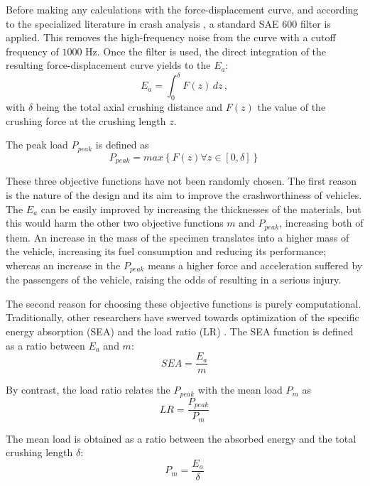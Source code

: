 \documentclass[cmfonts]{witpress}
\begin{document}
Before making any calculations with the force-displacement curve, and according to the specialized literature in crash analysis \cite{Huanglibro}, a standard SAE 600 filter \cite{J211} is applied. This removes the high-frequency noise from the curve with a cutoff frequency of ${1000}$ Hz. Once the filter is used, the direct integration of the resulting force-displacement curve yields to the $E_a$:
\begin{equation}\label{Ea}
  E_{a}=\int _{0}^{\delta }F\! \left( z \right) \,dz\,,
\end{equation}
with $\delta$ being the total axial crushing distance and $F\! \left( z \right)$ the value of the crushing force at the crushing length $z$.

The peak load $P_{peak}$ is defined as
\begin{equation}\label{Peak}
 P_{peak}=max\left\{ F\! \left( z \right)  \forall z \in [0,\delta] \right\}
\end{equation}

These three objective functions have not been randomly chosen. The first reason is the nature of the design and its aim to improve the crashworthiness of vehicles. The $E_a$ can be easily improved by increasing the thicknesses of the materials, but this would harm the other two objective functions $m$ and $P_{peak}$, increasing both of them. An increase in the mass of the specimen translates into a higher mass of the vehicle, increasing its fuel consumption and reducing its performance; whereas an increase in the $P_{peak}$ means a higher force and acceleration suffered by the passengers of the vehicle, raising the odds of resulting in a serious injury.

The second reason for choosing these objective functions is purely computational. Traditionally, other researchers have swerved towards optimization of the specific energy absorption (SEA) and the load ratio (LR) \cite{Hou2007555}. The SEA function is defined as a ratio between $E_a$ and $m$:
\begin{equation}\label{SEA}
  S\! EA=\dfrac {E_a} {m}
\end{equation}

By contrast, the load ratio relates the $P_{peak}$ with the mean load $P_m$ as
\begin{equation}\label{LR}
  LR=\dfrac {P_{peak}} {P_m}
\end{equation}

The mean load is obtained as a ratio between the absorbed energy and the total crushing length $\delta$:
\begin{equation}\label{Pm}
  P_{m}=\dfrac {E_a} {\delta}
\end{equation}
\end{document}
